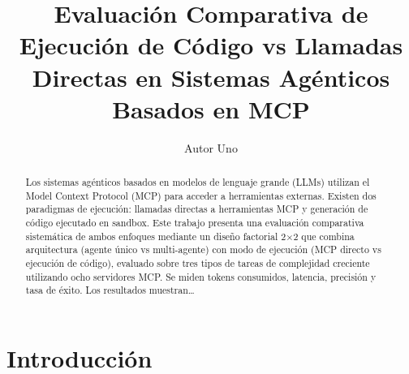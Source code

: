 \documentclass[runningheads]{llncs}
\begin{document}
%
\title{Evaluaci\'on Comparativa de Ejecuci\'on de C\'odigo vs Llamadas Directas en Sistemas Ag\'enticos Basados en MCP}
%
%
\author{Autor Uno}
%
%
%
\maketitle
%
\begin{abstract}
Los sistemas agénticos basados en modelos de lenguaje grande (LLMs) utilizan
el Model Context Protocol (MCP) para acceder a herramientas externas. Existen
dos paradigmas de ejecución: llamadas directas a herramientas MCP y generación
de código ejecutado en sandbox. Este trabajo presenta una evaluación comparativa
sistemática de ambos enfoques mediante un diseño factorial 2$\times$2 que combina
arquitectura (agente único vs multi-agente) con modo de ejecución (MCP directo
vs ejecución de código), evaluado sobre tres tipos de tareas de complejidad
creciente utilizando ocho servidores MCP. Se miden tokens consumidos, latencia,
precisión y tasa de éxito. Los resultados muestran\ldots

\end{abstract}
%
\section{Introducci\'on}
\label{sec:intro}

\end{document}

